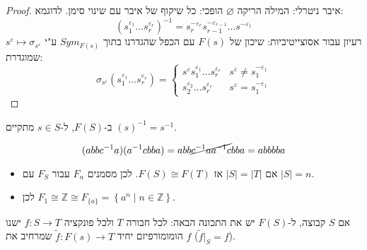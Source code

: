 \documentclass{tstextbook}
\begin{document}
\begin{proof}
איבר ניטרלי: המילה הריקה \(\varnothing\)
הופכי: כל שיקוף של איבר עם שינוי סימן. לדוגמא:
$$\left( s_{1}^{\varepsilon_{1}}\dots s_{r}^{\varepsilon_{r}} \right)^{-1} =s_{r}^{-\varepsilon_{r}}s_{r-1}^{-\varepsilon_{r-1}}\dots s^{-\varepsilon_{1}}$$
רעיון עבור אסוצייטיביות: שיכון של \(F(s)\) עם הכפל שהגדרנו בתוך \(Sym_{F(s)}\) ע"י \(s^{\varepsilon}\mapsto \sigma_{s^{\varepsilon}}\) שמוגדרת:
$$\sigma_{s^{\varepsilon}}\left( s_{1}^{\varepsilon_{1}}\dots s_{r}^{\varepsilon_{r}} \right)=\begin{cases}s^{\varepsilon}s_{1}^{\varepsilon_{1}}\dots s_{r}^{\varepsilon_{r}} & s^{\varepsilon}\neq s_{1}^{-\varepsilon_{1}} \\s_{2}^{\varepsilon_{2}}\dots s_{r}^{\varepsilon_{r}} & s^{\varepsilon}=s_{1}^{-\varepsilon_{1}}
\end{cases}$$

\end{proof}
\begin{remark}
ב-\(F(S)\), ל-\(s \in S\) מתקיים \((s)^{-1} =s ^{-1}\).

\end{remark}
\begin{example}
$$(abbc^{-1} a)(a^{-1} cbba)=abb\cancel{ c^{-1} aa^{-1} c }bba=abbbba$$

\end{example}
\begin{corollary}
  \begin{itemize}
    \item אם \(|S|=|T|\) אז \(F(S)\cong F(T)\). לכן מסמנים \(F_{n}\) עבור \(F_{S}\) עם  \(|S|=n\).
    \item לכן \(F_{1}\cong\mathbb{Z}\cong F_{\{ a \}}=\left\{  a^n\mid n\in \mathbb{Z}\right\}\).
  \end{itemize}
\end{corollary}
\begin{proposition}
אם \(S\) קבוצה, ל-\(F(S)\) יש את התכונה הבאה: לכל חבורה \(T\) ולכל פונקציה \(f:S\to T\) ישנו הומומורפיזם יחיד \(\tilde{f}:F(s)\to T\) שמרחיב את \(f\) (\(\tilde{f}|_{S}=f\)).

\end{proposition}
\end{document}
